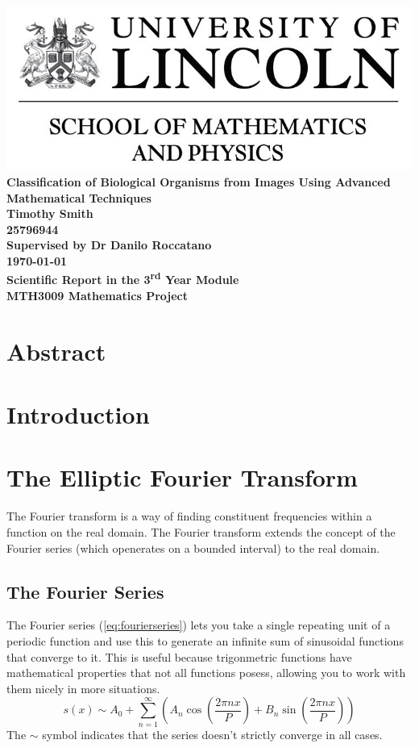 \documentclass[12pt,english]{article}
\begin{document}
\begin{center}
\includegraphics[scale = 0.5]{LincolnLogo}
\newline\newline
\thispagestyle{empty}
    \textbf{\huge{Classification of Biological Organisms from Images Using Advanced Mathematical Techniques} \\
    [100pt] \Large{Timothy Smith\\25796944} \\
    [40pt]\LARGE{Supervised by Dr Danilo Roccatano}\\
    [50pt]\today \\
	[40pt]Scientific Report in the 3\textsuperscript{rd} Year Module\\ MTH3009 Mathematics Project  }
\end{center}

\newpage
\section*{Abstract}

\newpage
\tableofcontents

\newpage
\section{Introduction}
\section{The Elliptic Fourier Transform}
The Fourier transform is a way of finding constituent frequencies within a function on the real domain.
The Fourier transform extends the concept of the Fourier series (which openerates on a bounded interval) to the real
domain.

\subsection{The Fourier Series}
The Fourier series
(\ref{eq:fourierseries})
lets you take a single repeating unit of a
periodic function and use this to generate an infinite sum of
sinusoidal functions that converge to it.
This is useful because trigonmetric functions have mathematical
properties that not all functions posess, allowing you to work
with them nicely in more situations.
\begin{equation}
	\label{eq:fourierseries}
	s(x) \sim A_0 + \sum_{n=1}^{\infty} \left(
		A_n \cos \left( \frac{2\pi nx}{P} \right) +
		B_n \sin \left( \frac{2\pi nx}{P} \right)
	\right)
\end{equation}
The \(\sim\) symbol indicates that the series doesn't strictly
converge in all cases.
\end{document}
